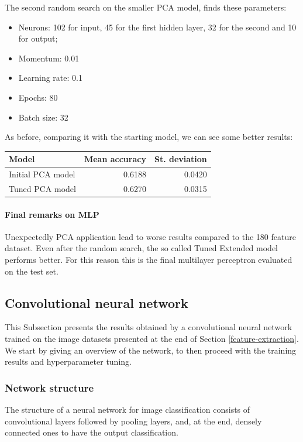 The second random search on the smaller PCA model, finds these parameters:
\begin{itemize}
    \item Neurons: 102 for input, 45 for the first hidden layer, 32 for the second and 10 for output;
    \item Momentum: 0.01
    \item Learning rate: 0.1
    \item Epochs: 80
    \item Batch size: 32
\end{itemize}
As before, comparing it with the starting model, we can see some better results:
\begin{center}
    \begin{tabular}{ |l|r|r| } 
        \hline
        Model & Mean accuracy & St. deviation \\
        \hline
        Initial PCA model & 0.6188 & 0.0420\\
        Tuned PCA model & 0.6270 & 0.0315\\
        \hline
    \end{tabular}
\end{center}

\paragraph{Final remarks on MLP}
Unexpectedly PCA application lead to worse results compared to the 180
feature dataset. Even after the random search, the so called Tuned Extended model
performs better. For this reason this is the final multilayer perceptron
evaluated on the test set.

\subsection{Convolutional neural network}
\label{cnn}
This Subsection presents the results obtained by a convolutional
neural network trained on the image datasets presented at the end of 
Section \vref*{feature-extraction}.
We start by giving an overview of the network, to then proceed 
with the training results and hyperparameter tuning.

\subsubsection{Network structure}
The structure of a neural network for image classification 
consists of convolutional layers followed by pooling layers, 
and, at the end, densely connected ones to have the output classification.

